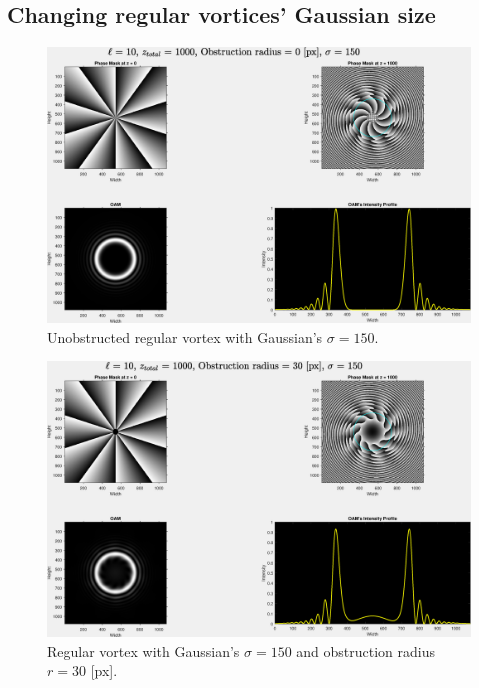\subsection{Changing regular vortices' Gaussian size}

\begin{figure}[htbp]
    \centering
    \includegraphics[width=12cm]{images/Appendices/Additional_Results/Sigma_150/type=0_r=0_zi=0_zf=1000.eps}
    \caption{Unobstructed regular vortex with Gaussian's $\sigma = 150$.}
    \label{fig:reg_s=150_r=0}
\end{figure}

\begin{figure}[htbp]
    \centering
    \includegraphics[width=12cm]{images/Appendices/Additional_Results/Sigma_150/type=0_r=30_zi=0_zf=1000.eps}
    \caption{Regular vortex with Gaussian's $\sigma = 150$ and obstruction radius $r=30$ [px].}
    \label{fig:reg_s=150_r=30}
\end{figure}

